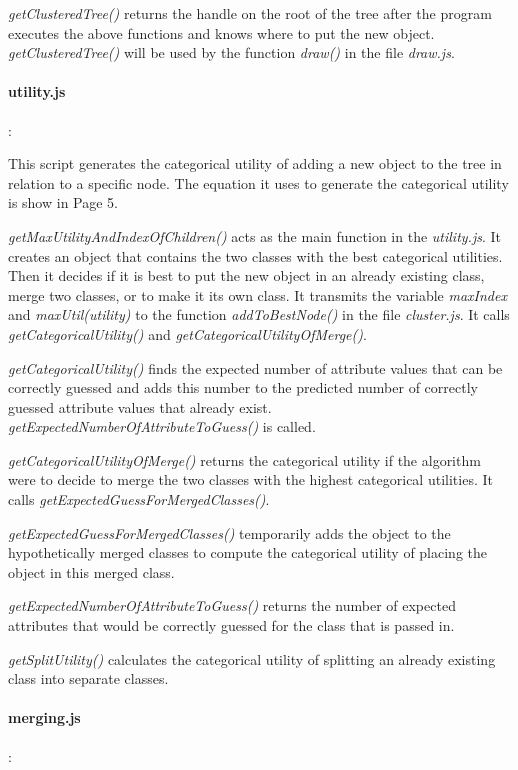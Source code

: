 \emph{getClusteredTree()} returns the handle on the root of the tree after the program executes the above functions and knows where to put the new object. \emph{getClusteredTree()} will be used by the function \emph{draw()} in the file \emph{draw.js}.

\paragraph{utility.js}:

This script generates the categorical utility of adding a new object to the tree in relation to a specific node. The equation it uses to generate the categorical utility is show in Page 5.

\emph{getMaxUtilityAndIndexOfChildren()} acts as the main function in the \emph{utility.js}. It creates an object that contains the two classes with the best categorical utilities. Then it decides if it is best to put the new object in an already existing class, merge two classes, or to make it its own class. It transmits the variable \emph{maxIndex} and \emph{maxUtil(utility)} to the function \emph{addToBestNode()} in the file \emph{cluster.js}. It calls \emph{getCategoricalUtility()} and \emph{getCategoricalUtilityOfMerge()}. 
 
\emph{getCategoricalUtility()} finds the expected number of attribute values that can be correctly guessed and adds this number to the predicted number of correctly guessed attribute values that already exist. \emph{getExpectedNumberOfAttributeToGuess()} is called.

\emph{getCategoricalUtilityOfMerge()} returns the categorical utility if the algorithm were to decide to merge the two classes with the highest categorical utilities. It calls \emph{getExpectedGuessForMergedClasses()}.

\emph{getExpectedGuessForMergedClasses()} temporarily adds the object to the hypothetically merged classes to compute the categorical utility of placing the object in this merged class.

\emph{getExpectedNumberOfAttributeToGuess()} returns the number of expected attributes  that would be correctly guessed for the class that is passed in.

\emph{getSplitUtility()} calculates the categorical utility of splitting an already existing class into separate classes.

\paragraph{merging.js}:

